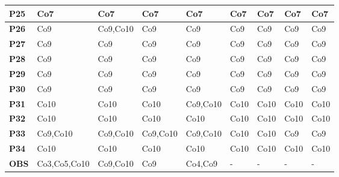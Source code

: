 \begin{table}[!htb]
\begin{tabular}{|M{1.0cm}|M{1.6cm}|M{1.6cm}|M{1.6cm}|M{1.6cm}|M{1.6cm}|M{1.6cm}|M{1.6cm}|M{1.6cm}|}
\textbf{P25}                   & Co7            & Co7            & Co7            & Co7            & Co7            & Co7            & Co7            & Co7            \\ \hline

\textbf{P26}                   & Co9            & Co9,Co10       & Co9            & Co9            & Co9            & Co9            & Co9            & Co9            \\ \hline

\textbf{P27}                   & Co9            & Co9            & Co9            & Co9            & Co9            & Co9            & Co9            & Co9            \\ \hline

\textbf{P28}                   & Co9            & Co9            & Co9            & Co9            & Co9            & Co9            & Co9            & Co9            \\ \hline

\textbf{P29}                   & Co9            & Co9            & Co9            & Co9            & Co9            & Co9            & Co9            & Co9            \\ \hline

\textbf{P30}                   & Co9            & Co9            & Co9            & Co9            & Co9            & Co9            & Co9            & Co9            \\ \hline

\textbf{P31}                   & Co10           & Co10           & Co10           & Co9,Co10       & Co10           & Co10           & Co10           & Co10           \\ \hline

\textbf{P32}                   & Co10           & Co10           & Co10           & Co10           & Co10           & Co10           & Co10           & Co10           \\ \hline

\textbf{P33}                   & Co9,Co10       & Co9,Co10       & Co9,Co10       & Co9,Co10       & Co10           & Co10           & Co9            & Co9            \\ \hline

\textbf{P34}                   & Co10           & Co10           & Co10           & Co10           & Co10           & Co10           & Co10           & Co10           \\ \hline

\textbf{OBS}                   & Co3,Co5,\newline Co10        & Co9,Co10       & Co9            & Co4,Co9        &   -             &        -        &      -          &      -          \\ \hline

\end{tabular}
\label{tabela_14}
\end{table}


